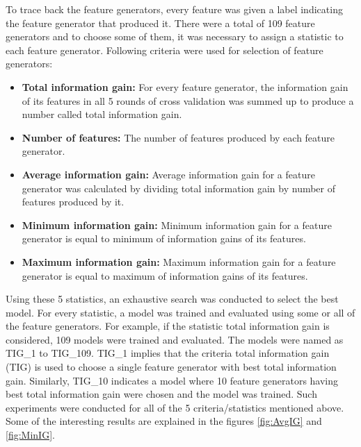 To trace back the feature generators, every feature was given a label indicating the feature generator that produced it. There were a total of 109 feature generators and to choose some of them, it was necessary to assign a statistic to each feature generator. Following criteria were used for selection of feature generators:

\begin{itemize}

\item \textbf{Total information gain:} For every feature generator, the information gain of its features in all 5 rounds of cross validation was summed up to produce a number called total information gain.

\item \textbf{Number of features:} The number of features produced by each feature generator.

\item \textbf{Average information gain:} Average information gain for a feature generator was calculated by dividing total information gain by number of features produced by it.

\item \textbf{Minimum information gain:} Minimum information gain for a feature generator is equal to minimum of information gains of its features.

\item \textbf{Maximum information gain:} Maximum information gain for a feature generator is equal to maximum of information gains of its features.

\end{itemize}

Using these 5 statistics, an exhaustive search was conducted to select the best model. For every statistic, a model was trained and evaluated using some or all of the feature generators. For example, if the statistic total information gain is considered, 109 models were trained and evaluated. The models were named as TIG\_1 to TIG\_109. TIG\_1 implies that the criteria total information gain (TIG) is used to choose a single feature generator with best total information gain. Similarly, TIG\_10 indicates a model where 10 feature generators having best total information gain were chosen and the model was trained. Such experiments were conducted for all of the 5 criteria/statistics mentioned above. Some of the interesting results are explained in the figures \ref{fig:AvgIG} and \ref{fig:MinIG}.

